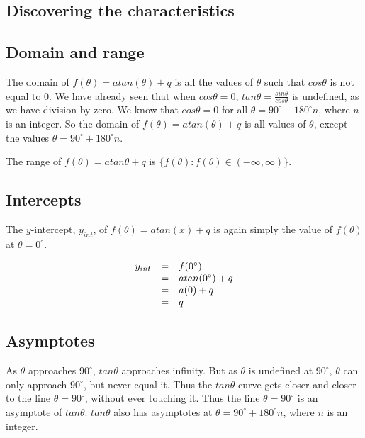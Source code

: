 \subsection*{Discovering the characteristics}
\subsection*{Domain and range}
\nopagebreak
The domain of $f(\theta )=atan(\theta )+q$ is all the values of $\theta $ such that $cos\theta $ is not equal to $0$. We have already seen that when $cos\theta =0$, $tan\theta =\frac{sin\theta }{cos\theta }$ is undefined, as we have division by zero. We know that $cos\theta =0$ for all $\theta ={90}^{\circ }+{180}^{\circ }n$, where $n$ is an integer. So the domain of $f(\theta )=atan(\theta )+q$ is all values of $\theta $, except the values $\theta ={90}^{\circ }+{180}^{\circ }n$.\par 
The range of $f(\theta )=atan\theta +q$ is $\{f(\theta ):f(\theta )\in (-\infty ,\infty )\}$.\par 

\subsection*{Intercepts}
\nopagebreak
The $y$-intercept, ${y}_{int}$, of $f(\theta )=atan(x)+q$ is again simply the value of $f(\theta )$ at $\theta ={0}^{\circ }$.\par 
\nopagebreak\noindent{}
\begin{equation*}
\begin{array}{ccc}\hfill {y}_{int}& =& f({0}^{\circ })\hfill \\ & =& atan({0}^{\circ })+q\hfill \\ & =& a(0)+q\hfill \\ & =& q\hfill \end{array}
\end{equation*}

\subsection*{Asymptotes}
\nopagebreak
As $\theta $ approaches ${90}^{\circ }$, $tan\theta $ approaches infinity. But as $\theta $ is undefined at ${90}^{\circ }$, $\theta $ can only approach ${90}^{\circ }$, but never equal it. Thus the $tan\theta $ curve gets closer and closer to the line $\theta ={90}^{\circ }$, without ever touching it. Thus the line $\theta ={90}^{\circ }$ is an asymptote of $tan\theta $. $tan\theta $ also has asymptotes at $\theta ={90}^{\circ }+{180}^{\circ }n$, where $n$ is an integer.\par 

